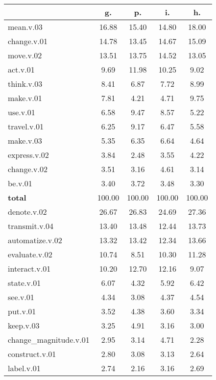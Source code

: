 \begin{table}[h!]
\begin{center}
\begin{tabular}{| l || c | c | c | c |}\hline
 & {\bf g.} & {\bf p.} & {\bf i.} & {\bf h.} \\\hline\hline
mean.v.03 & 16.88  & 15.40  & 14.80  & 18.00 \\\hline
change.v.01 & 14.78  & 13.45  & 14.67  & 15.09 \\\hline
move.v.02 & 13.51  & 13.75  & 14.52  & 13.05 \\\hline
act.v.01 & 9.69  & 11.98  & 10.25  & 9.02 \\\hline
think.v.03 & 8.41  & 6.87  & 7.72  & 8.99 \\\hline
make.v.01 & 7.81  & 4.21  & 4.71  & 9.75 \\\hline
use.v.01 & 6.58  & 9.47  & 8.57  & 5.22 \\\hline
travel.v.01 & 6.25  & 9.17  & 6.47  & 5.58 \\\hline
make.v.03 & 5.35  & 6.35  & 6.64  & 4.64 \\\hline
express.v.02 & 3.84  & 2.48  & 3.55  & 4.22 \\\hline
change.v.02 & 3.51  & 3.16  & 4.61  & 3.14 \\\hline
be.v.01 & 3.40  & 3.72  & 3.48  & 3.30 \\\hline\hline
{{\bf total}} & 100.00  & 100.00  & 100.00  & 100.00 \\\hline\hline\hline
denote.v.02 & 26.67  & 26.83  & 24.69  & 27.36 \\\hline
transmit.v.04 & 13.40  & 13.48  & 12.44  & 13.73 \\\hline
automatize.v.02 & 13.32  & 13.42  & 12.34  & 13.66 \\\hline
evaluate.v.02 & 10.74  & 8.51  & 10.30  & 11.28 \\\hline
interact.v.01 & 10.20  & 12.70  & 12.16  & 9.07 \\\hline
state.v.01 & 6.07  & 4.32  & 5.92  & 6.42 \\\hline
see.v.01 & 4.34  & 3.08  & 4.37  & 4.54 \\\hline
put.v.01 & 3.52  & 4.38  & 3.60  & 3.34 \\\hline
keep.v.03 & 3.25  & 4.91  & 3.16  & 3.00 \\\hline
change\_magnitude.v.01 & 2.95  & 3.14  & 4.71  & 2.28 \\\hline
construct.v.01 & 2.80  & 3.08  & 3.13  & 2.64 \\\hline
label.v.01 & 2.74  & 2.16  & 3.16  & 2.69 \\\hline\hline

\end{tabular}
\end{center}
\end{table}
